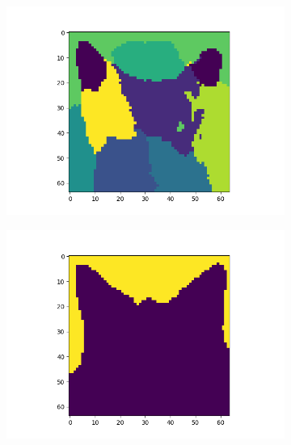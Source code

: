 \documentclass{article}
\begin{document}
\begin{figure}[H]
\begin{subfigure}{.33\textwidth}
  \centering
  \includegraphics[width=1\linewidth]{2f/Data represent.png}  
  
  \label{fig:sub-first}
\end{subfigure}
\begin{subfigure}{.33\textwidth}
  \centering
  \includegraphics[width=1\linewidth]{2f/Cats/Data represent cats.png}  
  

\end{subfigure}
\end{figure}
\end{document}
